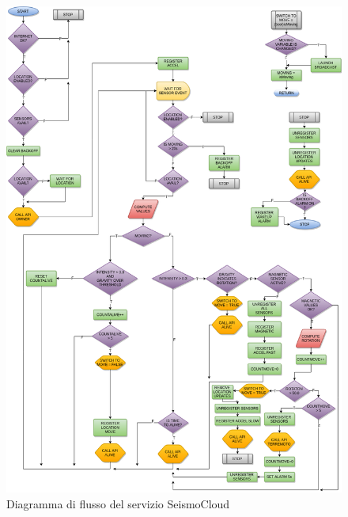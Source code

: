 \documentclass[a4paper,10pt]{memoir}
\begin{document}
\begin{figure}[ht]
\centering
\label{fig:serviceflowdiagram}
\caption{Diagramma di flusso del servizio SeismoCloud}
\includegraphics[width=\textwidth]{SeismoCloud_flowdiag}
\end{figure}

%
%
%
\end{document}
